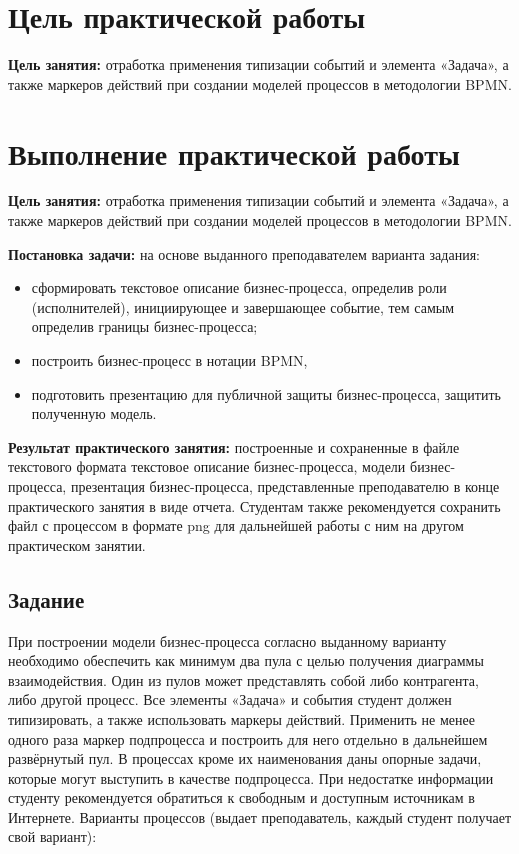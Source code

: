 \graphicspath{{./14/img/}}

\section{Цель практической работы}
\textbf{Цель занятия:}
отработка применения типизации событий и элемента
«Задача», а также маркеров действий при создании моделей процессов в
методологии BPMN.

\section{Выполнение практической работы}

\textbf{Цель занятия:} отработка применения типизации событий и элемента 
«Задача», а также маркеров действий при создании моделей процессов в 
методологии BPMN. 

\textbf{Постановка задачи:} 
на основе выданного преподавателем варианта задания:
\begin{itemize}
	\item сформировать текстовое описание бизнес-процесса, определив роли 
		(исполнителей), инициирующее и завершающее событие, тем самым 
		определив границы бизнес-процесса;
	\item построить бизнес-процесс в нотации BPMN,
	\item подготовить презентацию для публичной защиты бизнес-процесса, 
		защитить полученную модель.
\end{itemize}

\textbf{Результат практического занятия:} построенные и сохраненные в 
файле текстового формата текстовое описание бизнес-процесса, модели 
бизнес-процесса, презентация бизнес-процесса, представленные 
преподавателю в конце практического занятия в виде отчета. Студентам 
также рекомендуется сохранить файл с процессом в формате png для 
дальнейшей работы с ним на другом практическом занятии.

\subsection{Задание}
При построении модели бизнес-процесса согласно выданному варианту 
необходимо обеспечить как минимум два пула с целью получения 
диаграммы взаимодействия. Один из пулов может представлять собой либо 
контрагента, либо другой процесс. Все элементы «Задача» и события студент 
должен типизировать, а также использовать маркеры действий. Применить 
не менее одного раза маркер подпроцесса и построить для него отдельно в 
дальнейшем развёрнутый пул. В процессах кроме их наименования даны 
опорные задачи, которые могут выступить в качестве подпроцесса. При 
недостатке информации студенту рекомендуется обратиться к свободным и 
доступным источникам в Интернете. Варианты процессов (выдает 
преподаватель, каждый студент получает свой вариант): 

